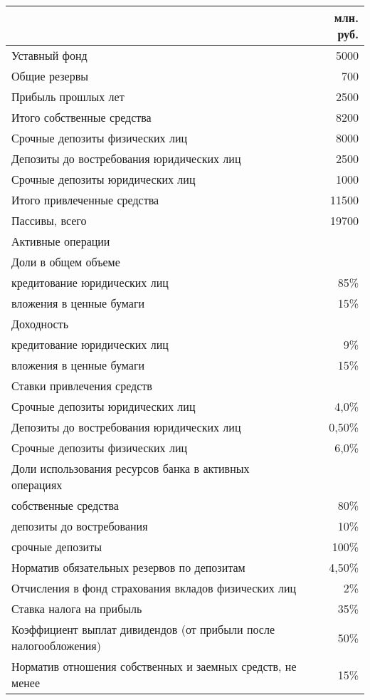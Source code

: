 \documentclass[12pt, table]{exam}
\begin{document}
\begin{questions}
\begin{tabularx}{\linewidth}[b]{@{}>{\raggedright\arraybackslash}Xr@{}}	
	& млн. руб. \\
	\midrule
    Уставный фонд & 5000 \\
	Общие резервы & 700 \\
	Прибыль прошлых лет & 2500 \\
	Итого собственные средства & 8200 \\
	\midrule
	Срочные депозиты физических лиц & 8000 \\
	Депозиты до востребования юридических лиц & 2500 \\
	Срочные депозиты юридических лиц & 1000 \\
	Итого привлеченные средства & 11500 \\
	Пассивы, всего & 19700 \\
	\midrule
	Активные операции &  \\
	\midrule
	Доли в общем объеме &  \\
	кредитование юридических лиц & 85\% \\
	вложения в ценные бумаги & 15\% \\
	\midrule
	Доходность &  \\
	кредитование юридических лиц & 9\% \\
	вложения в ценные бумаги & 15\% \\
	\midrule
	Ставки привлечения средств &  \\
	Срочные депозиты юридических лиц & 4,0\% \\
	Депозиты до востребования юридических лиц & 0,50\% \\
	Срочные депозиты физических лиц & 6,0\% \\
	\midrule
	Доли использования ресурсов банка в активных операциях &  \\
	собственные средства & 80\% \\
	депозиты до востребования & 10\% \\
	срочные депозиты & 100\% \\
	\midrule
	Норматив обязательных резервов по депозитам & 4,50\% \\
	Отчисления в фонд страхования вкладов физических лиц & 2\% \\
	Ставка налога на прибыль & 35\% \\
	Коэффициент выплат дивидендов (от прибыли после налогообложения) & 50\% \\
	Норматив отношения собственных и заемных средств, не менее & 15\% \\
	\bottomrule
\end{tabularx}%
\noaddpoints


\end{questions}
\end{document}
